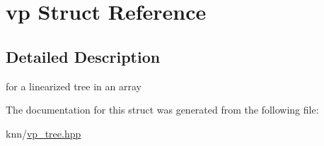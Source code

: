 \hypertarget{structvp}{}\section{vp Struct Reference}
\label{structvp}


\subsection{Detailed Description}
for a linearized tree in an array 

The documentation for this struct was generated from the following file\+:\begin{DoxyCompactItemize}
\item 
knn/\hyperlink{vp__tree_8hpp}{vp\+\_\+tree.\+hpp}\end{DoxyCompactItemize}

